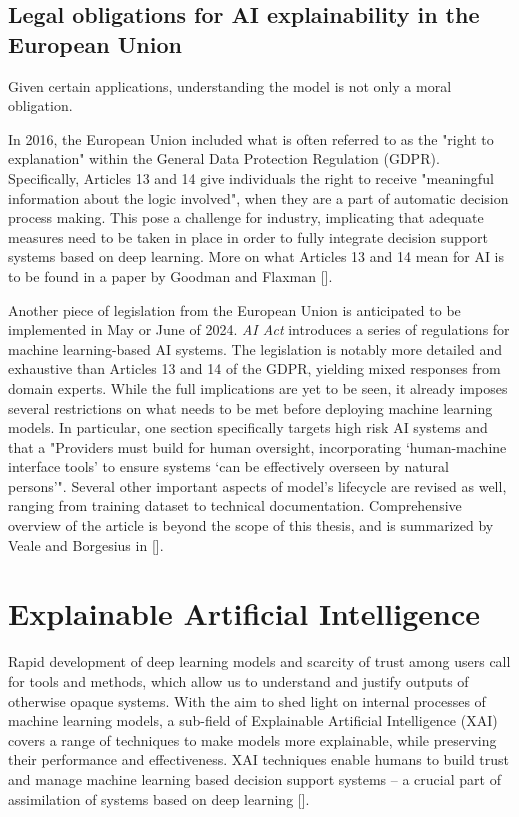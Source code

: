 \subsection{Legal obligations for AI explainability in the European Union}

Given certain applications, understanding the model is not only a moral obligation.

In 2016, the European Union included what is often referred to as the "right to explanation" within the General Data Protection Regulation (GDPR). Specifically, Articles 13 and 14 give individuals the right to receive "meaningful information about the logic involved", when they are a part of automatic decision process making.  This pose a challenge for industry, implicating that adequate measures need to be taken in place in order to fully integrate decision support systems based on deep learning. More on what Articles 13 and 14 mean for AI is to be found in a paper by Goodman and Flaxman [].


Another piece of legislation from the European Union is anticipated to be implemented in May or June of 2024. \emph{AI Act} introduces a series of regulations for machine learning-based AI systems. The legislation is notably more detailed and exhaustive than Articles 13 and 14 of the GDPR, yielding mixed responses from domain experts. While the full implications are yet to be seen, it already imposes several restrictions on what needs to be met before deploying machine learning models. In particular, one section specifically targets high risk AI systems and that a "Providers must build for human oversight, incorporating ‘human-machine interface tools’ to ensure systems ‘can be effectively overseen by natural persons’". Several other important aspects of model's lifecycle are revised as well, ranging from training dataset to technical documentation. Comprehensive overview of the article is beyond the scope of this thesis, and is summarized by Veale and Borgesius in [].


\section{Explainable Artificial Intelligence}

Rapid development of deep learning models and scarcity of trust among users call for tools and methods, which allow us to understand and justify outputs of otherwise opaque systems. With the aim to shed light on internal processes of machine learning models, a sub-field of Explainable Artificial Intelligence (XAI) covers a range of techniques to make models more explainable, while preserving their performance and effectiveness. XAI techniques enable humans to build trust and manage machine learning based decision support systems -- a crucial part of assimilation of systems based on deep learning [].


